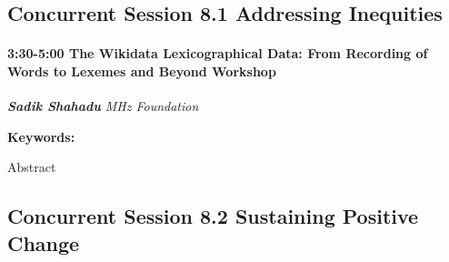 \documentclass[
]{book}
\begin{document}
\hypertarget{concurrent-session-8.1-addressing-inequities}{%
\subsection*{Concurrent Session 8.1 \textbar{} Addressing Inequities}\label{concurrent-session-8.1-addressing-inequities}}

\begin{session}
\hypertarget{the-wikidata-lexicographical-data-from-recording-of-words-to-lexemes-and-beyond-workshop}{%
\paragraph*{\texorpdfstring{3:30-5:00 \textbar{} \textbf{The Wikidata
Lexicographical Data: From Recording of Words to Lexemes and Beyond}
\textbar{}
Workshop}{3:30-5:00 \textbar{} The Wikidata Lexicographical Data: From Recording of Words to Lexemes and Beyond \textbar{} Workshop}}\label{the-wikidata-lexicographical-data-from-recording-of-words-to-lexemes-and-beyond-workshop}}

\textbf{\emph{Sadik Shahadu}} \textbar{} \emph{MHz Foundation}

\textbf{Keywords:}

Abstract
\end{session}

\hypertarget{concurrent-session-8.2-sustaining-positive-change}{%
\subsection*{Concurrent Session 8.2 \textbar{} Sustaining Positive Change}\label{concurrent-session-8.2-sustaining-positive-change}}
\end{document}
